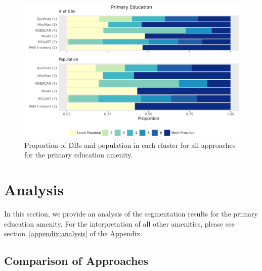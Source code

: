 \documentclass[11pt, a4paper]{article}
\begin{document}
\begin{figure}[H]
\centering
\includegraphics[width=\textwidth]{./barplot_comparison/Primary Education_barplot.png}
\caption[Primary education profile barplot]{Proportion of DBs and population in each cluster for all approaches for the primary education amenity.}\label{prieducbarplot}
\end{figure}













\pagebreak
\section{Analysis}

In this section, we provide an analysis of the segmentation results for the primary education amenity. For the interpretation of all other amenities, please see section~\ref{appendix:analysis} of the Appendix.


\subsection{Comparison of Approaches}
\end{document}
